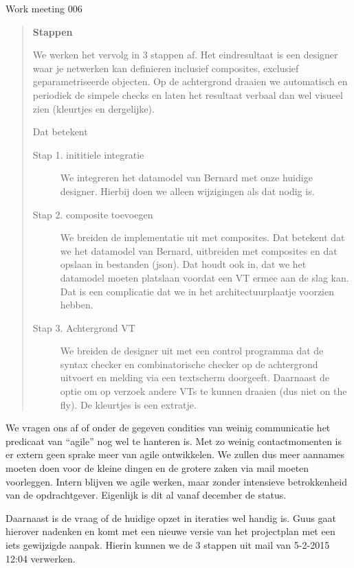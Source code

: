 \documentclass[a4paper,final]{article}
\begin{document}
\begin{Minutes}{Work meeting 006}
\begin{quote}

\textbf{Stappen}

We werken het vervolg in 3 stappen af. Het eindresultaat is een designer waar je netwerken kan definieren inclusief composites, exclusief geparametriseerde objecten. Op de achtergrond draaien we automatisch en periodiek de simpele checks en laten het resultaat verbaal dan wel visueel zien (kleurtjes en dergelijke).

Dat betekent

\begin{description}
\item[Stap 1. inititiele integratie]
We integreren het datamodel van Bernard met onze huidige designer. Hierbij doen we alleen wijzigingen als dat nodig is.

\item[Stap 2. composite toevoegen]
We breiden de implementatie uit met composites. Dat betekent dat we het datamodel van Bernard, uitbreiden met composites en dat opslaan in bestanden (json). Dat houdt ook in, dat we het datamodel moeten platslaan voordat een VT ermee aan de slag kan. Dat is een complicatie dat we in het architectuurplaatje voorzien hebben.

\item[Stap 3. Achtergrond VT]
We breiden de designer uit met een control programma dat de syntax checker en combinatorische checker op de achtergrond uitvoert en melding via een textscherm doorgeeft. Daarnaast de optie om op verzoek andere VTs te kunnen draaien (dus niet on the fly). De kleurtjes is een extratje.
\end{description}

\end{quote}


We vragen ons af of onder de gegeven condities van weinig communicatie het predicaat van ``agile'' nog
wel te hanteren is. Met zo weinig contactmomenten is er extern geen sprake meer van agile ontwikkelen.
We zullen dus meer aannames moeten doen voor de kleine dingen en de grotere zaken via
mail moeten voorleggen. Intern blijven we agile werken, maar zonder intensieve betrokkenheid van
de opdrachtgever. Eigenlijk is dit al vanaf december de status.

Daarnaast is de vraag of de huidige opzet in iteraties wel handig is. Guus gaat hierover  
nadenken en komt met een nieuwe versie van het projectplan met een iets gewijzigde aanpak. 
Hierin kunnen we de 3 stappen uit mail van 5-2-2015 12:04 verwerken. 



\end{Minutes}
\end{document}
